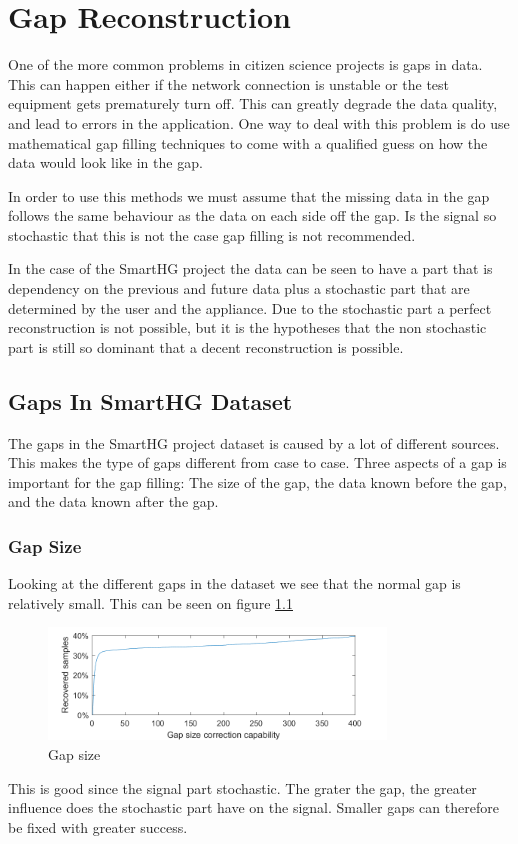 \chapter{Gap Reconstruction}
One of the more common problems in citizen science projects is gaps in data. This can happen either if the network connection is unstable or the test equipment gets prematurely turn off. This can greatly degrade the data quality, and lead to errors in the application. One way to deal with this problem is do use mathematical gap filling techniques to come with a qualified guess on how the data would look like in the gap. 

In order to use this methods we must assume that the missing data in the gap follows the same behaviour as the data on each side off the gap. Is the signal so stochastic that this is not the case gap filling is not recommended\citep{RefWorks:10}. 

In the case of the SmartHG project the data can be seen to have a part that is dependency on the previous and future data plus a stochastic part that are determined by the user and the appliance. Due to the stochastic part a perfect reconstruction is not possible, but it is the hypotheses that the non stochastic part is still so dominant that a decent reconstruction is possible. 
\section{Gaps In SmartHG Dataset}
The gaps in the SmartHG project dataset is caused by a lot of different sources. This makes the type of gaps different from case to case. Three aspects of a gap is important for the gap filling: The size of the gap, the data known before the gap, and the data known after the gap. 
\subsection{Gap Size}
Looking at the different gaps in the dataset we see that the normal gap is relatively small. This can be seen on figure \ref{fig:GapSize}
\begin{figure}[H]
\centering
\includegraphics[width=0.8\textwidth]{billeder/CorrectionCapability.png}
\caption{Gap size}
\label{fig:GapSize}
\end{figure}
This is good since the signal part stochastic. The grater the gap, the greater influence does the stochastic part have on the signal. Smaller gaps can therefore be fixed with greater success. 
